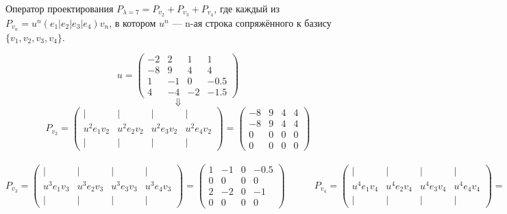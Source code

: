 \documentclass{article}
\begin{document}
\begin{center}
Оператор проектирования $P_{\lambda=7} = P_{v_2} + P_{v_3} + P_{v_4}$, где каждый из $P_{v_n} = u^n(e_1|e_2|e_3|e_4)v_n$, в котором $u^n$ --- n-ая строка сопряжённого к базису $\{v_1, v_2, v_3, v_4\}$.
\end{center}
$$u = \begin{pmatrix}
-2 & 2 & 1 & 1 \\
-8 & 9 & 4 & 4 \\
1 & -1 & 0 & -0.5 \\
4 & -4 & -2 & -1.5
\end{pmatrix}$$
$$\Downarrow$$
$$P_{v_2} = \begin{pmatrix}
| & | & | & |\\
u^2e_1v_2 & u^2e_2v_2 & u^2e_3v_2 & u^2e_4v_2 \\
| & | & | & |
\end{pmatrix} = \begin{pmatrix}
-8 & 9 & 4 & 4 \\
-8 & 9 & 4 & 4 \\
0 & 0 & 0 & 0 \\
0 & 0 & 0 & 0
\end{pmatrix}$$ \\
$$P_{v_3} = \begin{pmatrix}
| & | & | & |\\
u^3e_1v_3 & u^3e_2v_3 & u^3e_3v_3 & u^3e_4v_3 \\
| & | & | & |
\end{pmatrix} = \begin{pmatrix}
1 & -1 & 0 & -0.5 \\
0 & 0 & 0 & 0 \\
2 & -2 & 0 & -1 \\
0 & 0 & 0 & 0
\end{pmatrix} \qquad\quad P_{v_4} = \begin{pmatrix}
| & | & | & |\\
u^4e_1v_4 & u^4e_2v_4 & u^4e_3v_4 & u^4e_4v_4 \\
| & | & | & |
\end{pmatrix} = \begin{pmatrix}
4 & -4 & -2 & -1.5 \\
0 & 0 &0 & 0 \\
0 & 0 &0 & 0 \\
8 & -8 & -4 & -3
\end{pmatrix}$$\\
\end{document}
